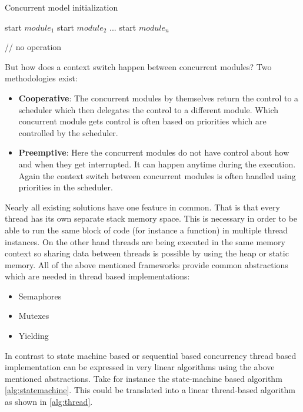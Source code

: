 \begin{algorithm}[H]
\caption{Concurrent model initialization}
\label{alg:threads}
\begin{algorithmic}

\STATE start $module_1$
\STATE start $module_2$
\STATE ...
\STATE start $module_n$

    \STATE // no operation
\ENDWHILE
\end{algorithmic}
\end{algorithm}

But how does a context switch happen between concurrent modules? Two methodologies exist:

\begin{itemize}
\item \textbf{Cooperative}: The concurrent modules by themselves return the control to a scheduler which then delegates the control to a different module. Which concurrent module gets control is often based on priorities which are controlled by the scheduler.
\item \textbf{Preemptive}: Here the concurrent modules do not have control about how and when they get interrupted. It can happen anytime during the execution. Again the context switch between concurrent modules is often handled using priorities in the scheduler.
\end{itemize}

Nearly all existing solutions have one feature in common. That is that every thread has its own separate stack memory space. This is necessary in order to be able to run the same block of code (for instance a function) in multiple thread instances. On the other hand threads are being executed in the same memory context so sharing data between threads is possible by using the heap or static memory. All of the above mentioned frameworks provide common abstractions which are needed in thread based implementations:

\begin{itemize}
\item Semaphores
\item Mutexes
\item Yielding
\end{itemize}

In contrast to state machine based or sequential based concurrency thread based implementation can be expressed in very linear algorithms using the above mentioned abstractions. Take for instance the state-machine based algorithm \ref{alg:statemachine}. This could be translated into a linear thread-based algorithm as shown in \ref{alg:thread}.

